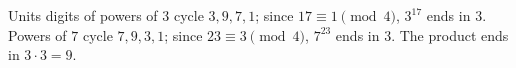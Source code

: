 Units digits of powers of $3$ cycle $3,9,7,1$; since $17\equiv1\pmod4$, $3^{17}$ ends in $3$. Powers of $7$ cycle $7,9,3,1$; since $23\equiv3\pmod4$, $7^{23}$ ends in $3$. The product ends in $3\cdot3=\boxed{9}$.
